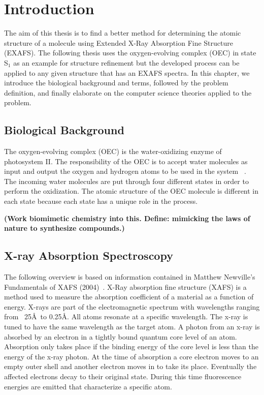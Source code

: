 \chapter{Introduction}

The aim of this thesis is to find a better method for determining the atomic structure of a molecule using Extended X-Ray Absorption Fine Structure (EXAFS). The following thesis uses the oxygen-evolving complex (OEC) in state S$_{1}$ as an example for structure refinement but the developed process can be applied to any given structure that has an EXAFS spectra. In this chapter, we introduce the biological background and terms, followed by the problem definition, and finally elaborate on the computer science theories applied to the problem.

\section{Biological Background}

The oxygen-evolving complex (OEC) is the water-oxidizing enzyme of photosystem II. The responsibility of the OEC is to accept water molecules as input and output the oxygen and hydrogen atoms to be used in the system ~\cite{oxygenicPhotosynthesis}. The incoming water molecules are put through four different states in order to perform the oxidization. The atomic structure of the OEC molecule is different in each state because each state has a unique role in the process.

\textbf{(Work biomimetic chemistry into this. Define: mimicking the laws of nature to synthesize compounds.)}

\section{X-ray Absorption Spectroscopy}

The following overview is based on information contained in Matthew Newville’s Fundamentals of XAFS (2004)~\cite{newville2004fundamentals}. X-Ray absorption fine structure (XAFS) is a method used to measure the absorption coefficient of a material as a function of energy. X-rays are part of the electromagnetic spectrum with wavelengths ranging from ~25\AA\ to 0.25\AA. All atoms resonate at a specific wavelength. The x-ray is tuned to have the same wavelength as the target atom. A photon from an x-ray is absorbed by an electron in a tightly bound quantum core level of an atom. Absorption only takes place if the binding energy of the core level is less than the energy of the x-ray photon. At the time of absorption a core electron moves to an empty outer shell and another electron moves in to take its place. Eventually the affected electrons decay to their original state. During this time fluorescence energies are emitted that characterize a specific atom.

